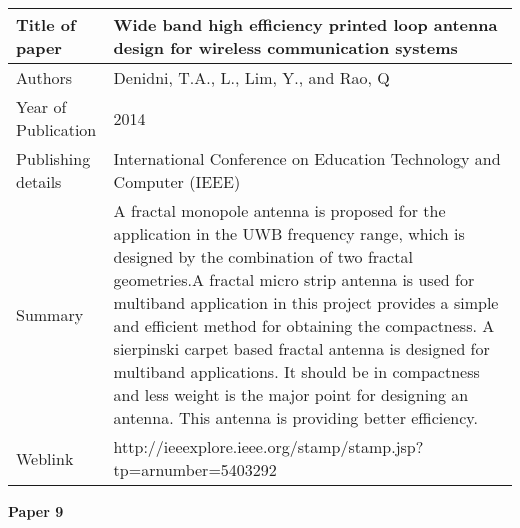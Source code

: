 		  \begin{center}
		  	\begin{table}[H]
		  		\centering
		  		\begin{tabular}{ |l|p{11cm}| }
		  			\hline
		  			Title of paper &  Wide band high efficiency printed loop antenna design for wireless communication systems  \\
		  			\hline
		  			Authors & Denidni, T.A., L., Lim, Y., and Rao, Q \\
		  			\hline
		  			Year of Publication & 2014 \\
		  			\hline
		  			Publishing details & International Conference on Education Technology and Computer (IEEE) \\ \hline
		  			Summary & A fractal monopole antenna is proposed for the application in the UWB frequency range, which is designed by the combination of two fractal geometries.A fractal micro strip antenna is used for multiband application in this project provides a simple and efficient method for obtaining the compactness. A sierpinski carpet based fractal antenna is designed for multiband applications. It should be in compactness and less weight is the major point for designing an antenna. This antenna is providing better efficiency.\\
		  			\hline
		  			Weblink & http://ieeexplore.ieee.org/stamp/stamp.jsp?tp=arnumber=5403292 \\
		  			\hline			 
		  		\end{tabular}		
		  		
		  	\end{table}
		  \end{center}
		
		\cleardoublepage
		
			\begin{flushleft}
				\textbf{Paper 9}
			\end{flushleft}
			
